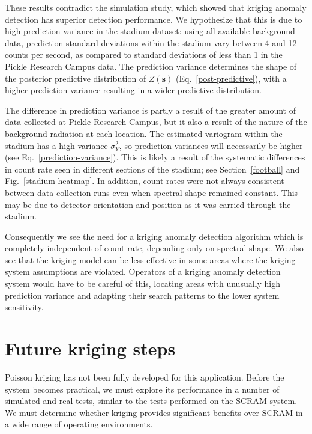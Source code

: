These results contradict the simulation study, which showed that kriging anomaly
detection has superior detection performance. We hypothesize that this is due to
high prediction variance in the stadium dataset: using all available background
data, prediction standard deviations within the stadium vary between 4 and 12
counts per second, as compared to standard deviations of less than 1 in the
Pickle Research Campus data. The prediction variance determines the shape of the
posterior predictive distribution of \(Z(\mathbf{s})\)
(Eq.~\ref{post-predictive}), with a higher prediction variance resulting in a
wider predictive distribution.

The difference in prediction variance is partly a result of the greater amount
of data collected at Pickle Research Campus, but it also a result of the nature
of the background radiation at each location. The estimated variogram within the
stadium has a high variance \(\sigma_Y^2\), so prediction variances will
necessarily be higher (see Eq.~\ref{prediction-variance}). This is likely a
result of the systematic differences in count rate seen in different sections of
the stadium; see Section~\ref{football} and Fig.~\ref{stadium-heatmap}. In
addition, count rates were not always consistent between data collection runs
even when spectral shape remained constant. This may be due to detector
orientation and position as it was carried through the stadium.

Consequently we see the need for a kriging anomaly detection algorithm which is
completely independent of count rate, depending only on spectral shape. We also
see that the kriging model can be less effective in some areas where the kriging
system assumptions are violated. Operators of a kriging anomaly detection system
would have to be careful of this, locating areas with unusually high prediction
variance and adapting their search patterns to the lower system sensitivity.

\section{Future kriging steps}

Poisson kriging has not been fully developed for this application. Before the
system becomes practical, we must explore its performance in a number of
simulated and real tests, similar to the tests performed on the SCRAM system. We
must determine whether kriging provides significant benefits over SCRAM in a
wide range of operating environments.


